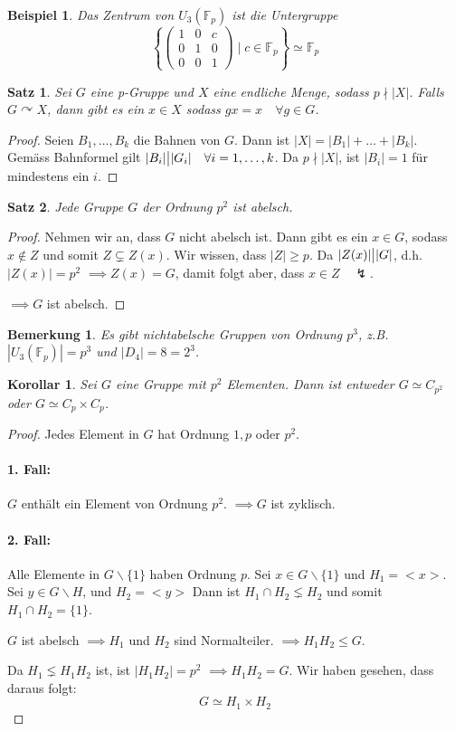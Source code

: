 \documentclass{article}
\theoremstyle{plain}
\newtheorem{theorem}{Satz}
\newtheorem{corollary}{Korollar}
\newtheorem{beispiel}{Beispiel}
\newtheorem{bemerkung}{Bemerkung}
\newcommand{\F}{\mathbb{F}}
\newcommand{\ug}{\leq}
\newcommand{\teilt}{\big{|}}
\newcommand{\zykl}[1]{{<}{#1}{>}}
\newcommand{\iso}{\simeq}
\newcommand{\operateson}{\curvearrowright}
\begin{document}
\begin{beispiel}
    Das Zentrum von $U_3(\F_p)$ ist die Untergruppe 
    $$\left\{\begin{pmatrix}
            1&0&c\\
            0&1&0\\
            0&0&1
        \end{pmatrix}\mid c\in \F_p\right\}\iso\F_p$$
\end{beispiel}
\begin{theorem}
    Sei $G$ eine p-Gruppe und $X$ eine endliche Menge, sodass $p\nmid |X|$.
    Falls $G \operateson X$, dann gibt es ein $x\in X$ sodass $gx=x\quad \forall g\in G$.
\end{theorem}
\begin{proof}
    Seien $B_1,\ldots,B_k$ die Bahnen von $G$. Dann ist $|X|=|B_1|+\ldots+|B_k|$.
    Gemäss Bahnformel gilt $|B_i|\teilt |G_i|\quad \forall i=1,\ldots, k$.
    Da $p\nmid |X|$, ist $|B_i|=1$ für mindestens ein $i$.
\end{proof}

\begin{theorem}
    Jede Gruppe $G$ der Ordnung $p^2$ ist abelsch.
\end{theorem}
\begin{proof}
    Nehmen wir an, dass $G$ nicht abelsch ist. 
    Dann gibt es ein $x\in G$, sodass $x\notin Z$ und somit $Z\subsetneq Z(x)$.
    Wir wissen, dass $|Z|\geq p$.
    Da $|Z(x)|\teilt|G|$, d.h.  $|Z(x)|=p^2$
    $\implies Z(x)=G$, damit folgt aber, dass $x\in Z\quad \lightning$.

    $\implies G$ ist abelsch.
\end{proof}
\begin{bemerkung}
    Es gibt nichtabelsche Gruppen von Ordnung $p^3$, z.B. $|U_3(\F_p)| = p^3$ und $|D_4| = 8 = 2^3$.
\end{bemerkung}
\begin{corollary}
    Sei $G$ eine Gruppe mit $p^2$ Elementen. Dann ist entweder $G\iso C_{p^2}$ oder $G \iso C_p\times C_p$.
\end{corollary}
\begin{proof}
    Jedes Element in $G$ hat Ordnung $1, p$ oder $p^2$.
    \paragraph{1. Fall:} $G$ enthält ein Element von Ordnung $p^2$. $\implies G$ ist zyklisch.
    \paragraph{2. Fall:} Alle Elemente in $G\backslash\{1\}$ haben Ordnung $p$.
    Sei $x\in G\backslash\{1\}$ und $H_1=\zykl{x}$. Sei $y\in G\backslash H$, und $H_2=\zykl{y}$
    Dann ist $H_1\cap H_2 \lneq H_2$
    und somit $H_1 \cap H_2 = \{1\}$.

    $G$ ist abelsch $\implies H_1$ und $H_2$ sind Normalteiler.
    $\implies H_1H_2 \ug G$.

    Da $H_1 \lneq H_1H_2$ ist, ist $|H_1H_2|=p^2$ $\implies H_1H_2=G$.
    Wir haben gesehen, dass daraus folgt:
    $$G\iso H_1\times H_2$$
\end{proof}
\end{document}
